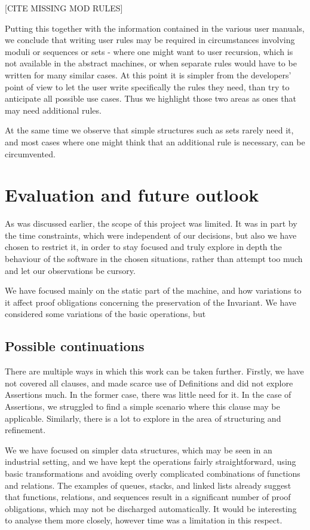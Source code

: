 \documentclass[11pt,journal]{IEEEtran}
\begin{document}
	[CITE MISSING MOD RULES]
	
	Putting this together with the information contained in the various user manuals, we conclude that writing user rules may be required in circumstances involving moduli or sequences or sets - where one might want to user recursion, which is not available in the abstract machines, or when separate rules would have to be written for many similar cases. At this point it is simpler from the developers' point of view to let the user write specifically the rules they need, than try to anticipate all possible use cases. Thus we highlight those two areas as ones that may need additional rules.
	
	At the same time we observe that simple structures such as sets rarely need it, and most cases where one might think that an additional rule is necessary, can be circumvented.
	\section{Evaluation and future outlook}
	As was discussed earlier, the scope of this project was limited. It was in part by the time constraints, which were independent of our decisions, but also we have chosen to restrict it, in order to stay focused and truly explore in depth the behaviour of the software in the chosen situations, rather than attempt too much and let our observations be cursory.
	
	We have focused mainly on the static part of the machine, and how variations to it affect proof obligations concerning the preservation of the Invariant. We have considered some variations of the basic operations, but 
	
	\subsection{Possible continuations}
	There are multiple ways in which this work can be taken further. Firstly, we have not covered all clauses, and made scarce use of Definitions and did not explore Assertions much. In the former case, there was little need for it. In the case of Assertions, we struggled to find a simple scenario where this clause may be applicable. Similarly, there is a lot to explore in the area of structuring and refinement.
	
	We we have focused on simpler data structures, which may be seen in an industrial setting, and we have kept the operations fairly straightforward, using basic transformations and avoiding overly complicated combinations of functions and relations. The examples of queues, stacks, and linked lists already suggest that functions, relations, and sequences result in a significant number of proof obligations, which may not be discharged automatically. It would be interesting to analyse them more closely, however time was a limitation in this respect.
	
\end{document}
